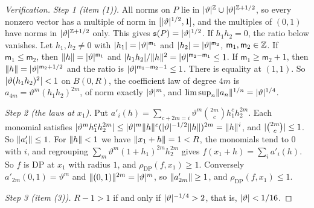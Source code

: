 \begin{proof}[Verification]
\emph{Step 1 (item (1)).} All norms on $P$ lie in $\lvert \vartheta\rvert^{\mathbb Z}\cup\lvert \vartheta\rvert^{\mathbb Z+1/2}$, so every nonzero vector has a multiple of norm in $[\lvert \vartheta\rvert^{1/2},1]$, and the multiples of $(0,1)$ have norms in $\lvert \vartheta\rvert^{\mathbb Z+1/2}$ only. This gives $\mathfrak s(P)=\lvert \vartheta\rvert^{1/2}$. If $h_1h_2=0$, the ratio below vanishes. Let $h_1,h_2\ne0$ with $\lvert h_1\rvert=\lvert \vartheta\rvert^{\mathsf m_1}$ and $\lvert h_2\rvert=\lvert \vartheta\rvert^{\mathsf m_2}$, $\mathsf m_1,\mathsf m_2\in\mathbb Z$. If $\mathsf m_1\le\mathsf m_2$, then $\lVert h\rVert=\lvert \vartheta\rvert^{\mathsf m_1}$ and $\lvert h_1h_2\rvert/\lVert h\rVert^2=\lvert \vartheta\rvert^{\mathsf m_2-\mathsf m_1}\le1$. If $\mathsf m_1\ge\mathsf m_2+1$, then $\lVert h\rVert=\lvert \vartheta\rvert^{\mathsf m_2+1/2}$ and the ratio is $\lvert \vartheta\rvert^{\mathsf m_1-\mathsf m_2-1}\le1$. There is equality at $(1,1)$. So $\lvert \vartheta(h_1h_2)^2\rvert<1$ on $B(0,R)$, the coefficient law of degree $4m$ is $a_{4m}=\vartheta^m(h_1h_2)^{2m}$, of norm exactly $\lvert \vartheta\rvert^m$, and $\limsup_n\lVert a_n\rVert^{1/n}=\lvert \vartheta\rvert^{1/4}$.

\emph{Step 2 (the laws at $x_1$).} Put $a'_i(h)=\sum_{c+2m=i}\vartheta^m\binom{2m}ch_1^ch_2^{2m}$. Each monomial satisfies $\lvert \vartheta^mh_1^ch_2^{2m}\rvert\le\lvert \vartheta\rvert^m\lVert h\rVert^c(\lvert \vartheta\rvert^{-1/2}\lVert h\rVert)^{2m}=\lVert h\rVert^i$, and $\lvert \binom{2m}c\rvert\le1$. So $\lVert a'_i\rVert\le1$. For $\lVert h\rVert<1$ we have $\lVert x_1+h\rVert=1<R$, the monomials tend to $0$ with $i$, and regrouping $\sum_m\vartheta^m(1+h_1)^{2m}h_2^{2m}$ gives $f(x_1+h)=\sum_ia'_i(h)$. So $f$ is DP at $x_1$ with radius $1$, and $\rho_{\mathrm{DP}}(f,x_1)\ge1$. Conversely $a'_{2m}(0,1)=\vartheta^m$ and $\lVert (0,1)\rVert^{2m}=\lvert \vartheta\rvert^m$, so $\lVert a'_{2m}\rVert\ge1$, and $\rho_{\mathrm{DP}}(f,x_1)\le1$.

\emph{Step 3 (item (3)).} $R-1>1$ if and only if $\lvert \vartheta\rvert^{-1/4}>2$, that is, $\lvert \vartheta\rvert<1/16$.
\end{proof}

